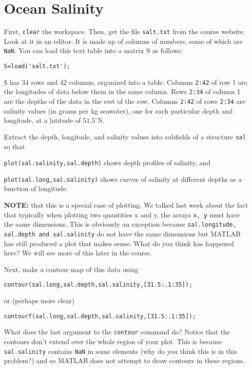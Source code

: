 \documentclass[letterpaper,10pt]{article}
\begin{document}
\section{Ocean Salinity}

First, \verb+clear+ the workspace. Then, get the file \verb+salt.txt+ from the course website. Look at it in an editor. It is made up of columns of numbers, some
of which are \verb+NaN+. You can load this text table into a matrix S as follows:
\begin{verbatim}
S=load('salt.txt');
\end{verbatim}

\verb+S+ has 34 rows and 42 columns, organized into a table. 
Columns \verb+2:42+ of row 1 are the longitudes of data below them in the same column.
Rows \verb+2:34+ of column 1 are the depths of the data in the rest of the row. 
Columns \verb+2:42+ of rows
\verb+2:34+ are salinity values (in grams per kg seawater), one for each particular depth and longitude, at a latitude of $51.5^{\circ}$N. 

Extract
the depth, longitude, and salinity values into subfields of a structure \verb+sal+ so that

\verb+plot(sal.salinity,sal.depth)+ shows depth profiles of salinity, and 

\verb+plot(sal.long,sal.salinity)+ shows curves of salinity at different depths as a function of longitude.

{\bf NOTE:} that this is a special case of plotting.  We talked last week about the fact that typically when plotting two quantities x and y, the arrays \verb+x, y+ must have the same dimensions.  This is obviously an exception because \verb+sal.longitude, sal.depth and sal.salinity+ do not have the same dimensions but MATLAB has still produced a plot that makes sense. What do you think has happened here?  We will see more of this later in the course.

Next, make a contour map of this data using
\begin{verbatim}
contour(sal.long,sal.depth,sal.salinity,[31.5:.1:35]);
\end{verbatim}
or (perhaps more clear)
\begin{verbatim}
contourf(sal.long,sal.depth,sal.salinity,[31.5:.1:35]);
\end{verbatim}

What does the last argument to the \verb+contour+ command do?  Notice that the contours don't extend over the whole region of your plot.  This is because \verb+sal.salinity+ contains \verb+NaN+ in some elements (why do you think this is in this problem?) and so MATLAB does not attempt to draw contours in these regions.  
\end{document}
